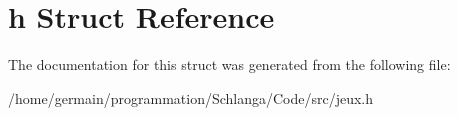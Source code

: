 \hypertarget{structjeux_1_1h}{\section{h Struct Reference}
\label{structjeux_1_1h}
}


The documentation for this struct was generated from the following file\-:\begin{DoxyCompactItemize}
\item 
/home/germain/programmation/\-Schlanga/\-Code/src/jeux.\-h\end{DoxyCompactItemize}
